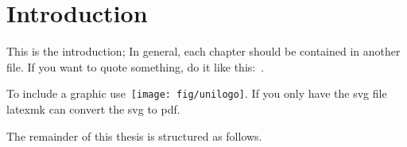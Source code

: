 \chapter{Introduction}
This is the introduction; In general, each chapter should be
contained in another file. If you want to quote something, do it like
this:~\cite{Cavin2002a}.

To include a graphic use~\texttt{[image: fig/unilogo]}.
If you only have the svg file latexmk can convert the svg to pdf.

The remainder of this thesis is structured as follows.
